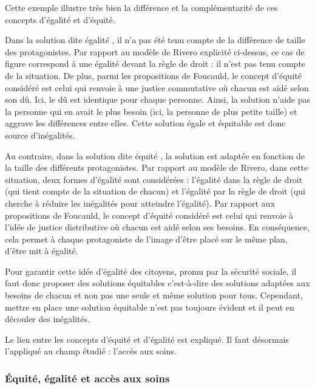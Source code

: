 Cette exemple illustre très bien la différence et la complémentarité de ces concepts d'égalité et d'équité. 

Dans la solution dite \og égalité \fg{}, il n'a pas été tenu compte de la différence de taille des protagonistes. Par rapport au modèle de Rivero explicité ci-dessus, ce cas de figure correspond à une égalité devant la règle de droit : il n'est pas tenu compte de la situation. De plus, parmi les propositions de Foucauld, le concept d'équité considéré est celui qui renvoie à une justice commutative où chacun est aidé selon son dû. Ici, le dû est identique pour chaque personne. Ainsi, la solution n'aide pas la personne qui en avait le plus besoin (ici, la personne de plus petite taille) et aggrave les différences entre elles. Cette solution égale et équitable est donc source d'inégalités.  


Au contraire, dans la solution dite \og équité \fg{}, la solution est adaptée en fonction de la taille des différents protagonistes. Par rapport au modèle de Rivero, dans cette situation, deux formes d'égalité sont considérées : l'égalité dans la règle de droit (qui tient compte de la situation de chacun) et l'égalité par la règle de droit (qui cherche à réduire les inégalités pour atteindre l'égalité). Par rapport aux propositions de Foucauld, le concept d'équité considéré est celui qui renvoie à l'idée de justice distributive où chacun est aidé selon ses besoins. En conséquence, cela permet à chaque protagoniste de l'image d'être placé sur le même plan, d'être mit à égalité.

Pour garantir cette idée d'égalité des citoyens, promu par la sécurité sociale, il faut donc proposer des solutions équitables c'est-à-dire des solutions adaptées aux besoins de chacun et non pas une seule et même solution pour tous. Cependant, mettre en place une solution équitable n'est pas toujours évident et il peut en découler des inégalités.

Le lien entre les concepts d'équité et d'égalité est expliqué. Il faut désormais l'appliqué au champ étudié : l'accès aux soins.

\subsubsection{Équité, égalité et accès aux soins}

